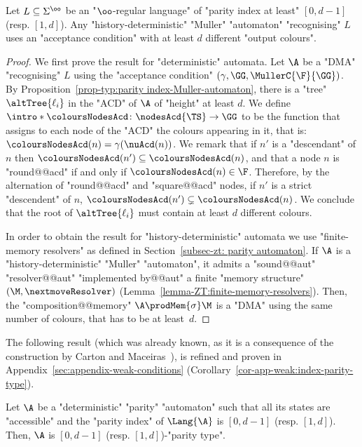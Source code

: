 \documentclass[10pt,a4paper]{amsart}
\renewcommand{\ss}{\sigma}
\renewcommand{\gg}{\gamma}
\renewcommand{\SS}{\Sigma}
\begin{document}
\begin{proposition}\label{prop-typ:min-colours-Muller-automata}
	Let $L\subseteq \SS^\oo$ be an "$\oo$-regular language" of "parity index at least" $[0,d-1]$ (resp. $[1,d]$). Any "history-deterministic" "Muller" "automaton" "recognising" $L$ uses an "acceptance condition" with at least $d$ different "output colours". 
\end{proposition}
\begin{proof}
	We first prove the result for "deterministic" automata. Let $\A$ be a "DMA" "recognising" $L$ using the "acceptance condition" $(\gg, \GG, \MullerC{\F}{\GG})$. By Proposition~\ref{prop-typ:parity index-Muller-automaton}, there is a "tree" $\altTree{\ell_i}$ in the "ACD" of $\A$ of "height" at least $d$. 
	\AP We define $\intro*\coloursNodesAcd\colon \nodesAcd{\TS} \to \GG$ to be the function that assigns to each node of the "ACD" the colours appearing in it, that is: $\coloursNodesAcd(n) = \gg(\nuAcd(n))$. We remark that if $n'$ is a "descendant" of $n$ then $\coloursNodesAcd(n')\subseteq \coloursNodesAcd(n)$, and that a node $n$ is "round@@acd" if and only if $\coloursNodesAcd(n)\in \F$. Therefore, by the alternation of "round@@acd" and "square@@acd" nodes, if $n'$ is a strict "descendent" of $n$, $\coloursNodesAcd(n')\subsetneq \coloursNodesAcd(n)$. We conclude that the root of $\altTree{\ell_i}$ must contain at least $d$ different colours.
	
	In order to obtain the result for "history-deterministic" automata we use "finite-memory resolvers" as defined in Section~\ref{subsec-zt: parity automaton}. If $\A$ is a "history-deterministic" "Muller" "automaton", it admits a "sound@@aut" "resolver@@aut" "implemented by@@aut" a finite "memory structure" $(\M, \nextmoveResolver)$ (Lemma~\ref{lemma-ZT:finite-memory-resolvers}). Then, the "composition@@memory" $\A \prodMem{\ss} \M$ is a "DMA" using the same number of colours, that has to be at least~$d$.
\end{proof}

The following result (which was already known, as it is a consequence of the construction by Carton and Maceiras~\cite{CartonMaceiras99RabinIndex}), is refined and proven in Appendix~\ref{sec:appendix-weak-conditions} (Corollary~\ref{cor-app-weak:index-parity-type}).
\begin{proposition}
	Let $\A$ be a "deterministic" "parity" "automaton" such that all its states are "accessible" and the "parity index" of $\Lang{\A}$ is $[0,d-1]$ (resp. $[1,d]$). 
	Then, $\A$ is $[0,d-1]$ (resp. $[1,d]$)-"parity type". 
\end{proposition}
\end{document}
